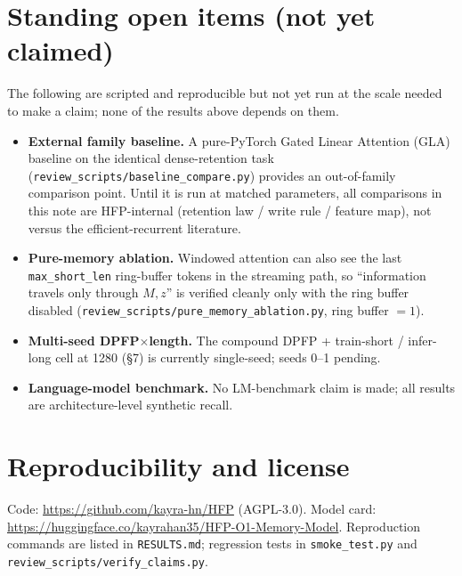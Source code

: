 \documentclass[11pt,a4paper]{article}
\newcommand{\code}[1]{\texttt{#1}}
\begin{document}
\section{Standing open items (not yet claimed)}
The following are scripted and reproducible but not yet run at the scale needed
to make a claim; none of the results above depends on them.
\begin{itemize}
\item \textbf{External family baseline.} A pure-PyTorch Gated Linear Attention
(GLA) baseline on the identical dense-retention task
(\code{review\_scripts/baseline\_compare.py}) provides an out-of-family
comparison point. Until it is run at matched parameters, all comparisons in this
note are HFP-internal (retention law / write rule / feature map), not versus the
efficient-recurrent literature.
\item \textbf{Pure-memory ablation.} Windowed attention can also see the last
\code{max\_short\_len} ring-buffer tokens in the streaming path, so ``information
travels only through $M,z$'' is verified cleanly only with the ring buffer
disabled (\code{review\_scripts/pure\_memory\_ablation.py}, ring buffer $=1$).
\item \textbf{Multi-seed DPFP$\times$length.} The compound DPFP + train-short /
infer-long cell at 1280 (\S7) is currently single-seed; seeds 0--1 pending.
\item \textbf{Language-model benchmark.} No LM-benchmark claim is made; all
results are architecture-level synthetic recall.
\end{itemize}

\section*{Reproducibility and license}
Code: \url{https://github.com/kayra-hn/HFP} (AGPL-3.0). Model card:
\url{https://huggingface.co/kayrahan35/HFP-O1-Memory-Model}. Reproduction
commands are listed in \code{RESULTS.md}; regression tests in
\code{smoke\_test.py} and \code{review\_scripts/verify\_claims.py}.
\end{document}
